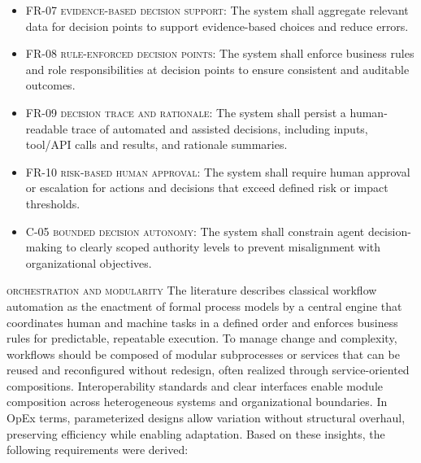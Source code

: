 \begin{itemize}
  \item \textsc{FR-07 evidence-based decision support}: The system shall aggregate relevant data for decision points to support evidence-based choices and reduce errors.
  \item \textsc{FR-08 rule-enforced decision points}: The system shall enforce business rules and role responsibilities at decision points to ensure consistent and auditable outcomes.
  \item \textsc{FR-09 decision trace and rationale}: The system shall persist a human-readable trace of automated and assisted decisions, including inputs, tool/API calls and results, and rationale summaries.
  \item \textsc{FR-10 risk-based human approval}: The system shall require human approval or escalation for actions and decisions that exceed defined risk or impact thresholds.
  \item \textsc{C-05 bounded decision autonomy}: The system shall constrain agent decision-making to clearly scoped authority levels to prevent misalignment with organizational objectives.
\end{itemize}

\noindent \textsc{orchestration and modularity} \quad The literature describes classical workflow automation as the enactment of formal process models by a central engine that coordinates human and machine tasks in a defined order and enforces business rules for predictable, repeatable execution. To manage change and complexity, workflows should be composed of modular subprocesses or services that can be reused and reconfigured without redesign, often realized through service-oriented compositions. Interoperability standards and clear interfaces enable module composition across heterogeneous systems and organizational boundaries. In OpEx terms, parameterized designs allow variation without structural overhaul, preserving efficiency while enabling adaptation. Based on these insights, the following requirements were derived:

